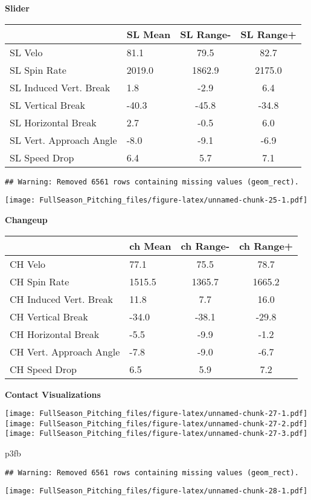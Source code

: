 \documentclass[]{article}
\newenvironment{Shaded}{\begin{snugshade}}{\end{snugshade}}
\newcommand{\NormalTok}[1]{#1}
\begin{document}
\textbf{Slider}

\begin{longtable}[]{@{}llcc@{}}
\toprule
& SL Mean & SL Range- & SL Range+\tabularnewline
\midrule
\endhead
SL Velo & 81.1 & 79.5 & 82.7\tabularnewline
SL Spin Rate & 2019.0 & 1862.9 & 2175.0\tabularnewline
SL Induced Vert. Break & 1.8 & -2.9 & 6.4\tabularnewline
SL Vertical Break & -40.3 & -45.8 & -34.8\tabularnewline
SL Horizontal Break & 2.7 & -0.5 & 6.0\tabularnewline
SL Vert. Approach Angle & -8.0 & -9.1 & -6.9\tabularnewline
SL Speed Drop & 6.4 & 5.7 & 7.1\tabularnewline
\bottomrule
\end{longtable}

\begin{verbatim}
## Warning: Removed 6561 rows containing missing values (geom_rect).
\end{verbatim}

\texttt{[image: FullSeason\_Pitching\_files/figure-latex/unnamed-chunk-25-1.pdf]}

\textbf{Changeup}

\begin{longtable}[]{@{}llcc@{}}
\toprule
& ch Mean & ch Range- & ch Range+\tabularnewline
\midrule
\endhead
CH Velo & 77.1 & 75.5 & 78.7\tabularnewline
CH Spin Rate & 1515.5 & 1365.7 & 1665.2\tabularnewline
CH Induced Vert. Break & 11.8 & 7.7 & 16.0\tabularnewline
CH Vertical Break & -34.0 & -38.1 & -29.8\tabularnewline
CH Horizontal Break & -5.5 & -9.9 & -1.2\tabularnewline
CH Vert. Approach Angle & -7.8 & -9.0 & -6.7\tabularnewline
CH Speed Drop & 6.5 & 5.9 & 7.2\tabularnewline
\bottomrule
\end{longtable}

\textbf{Contact Visualizations}

\texttt{[image: FullSeason\_Pitching\_files/figure-latex/unnamed-chunk-27-1.pdf]}
\texttt{[image: FullSeason\_Pitching\_files/figure-latex/unnamed-chunk-27-2.pdf]}
\texttt{[image: FullSeason\_Pitching\_files/figure-latex/unnamed-chunk-27-3.pdf]}

\begin{Shaded}
\begin{Highlighting}[]
\NormalTok{p3fb}
\end{Highlighting}
\end{Shaded}

\begin{verbatim}
## Warning: Removed 6561 rows containing missing values (geom_rect).
\end{verbatim}

\texttt{[image: FullSeason\_Pitching\_files/figure-latex/unnamed-chunk-28-1.pdf]}
\end{document}
